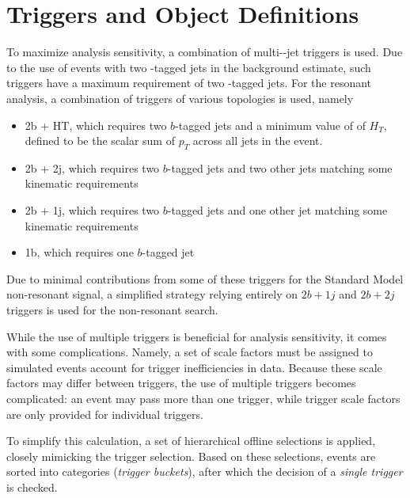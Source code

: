 \section{Triggers and Object Definitions}
\label{sec:trigger}
To maximize analysis sensitivity, a combination of multi-\Pqb-jet triggers is used. Due to the 
use of events with two \Pqb-tagged jets in the background estimate, such triggers have a maximum 
requirement of two \Pqb-tagged jets. For the resonant analysis, a combination of triggers of 
various topologies is used, namely
\begin{itemize}
	\item 2b + HT, which requires two $b$-tagged jets and a minimum value of of $H_{T}$, defined to be the scalar sum of $p_{T}$ across all jets in the event.
	\item 2b + 2j, which requires two $b$-tagged jets and two other jets matching some kinematic requirements
	\item 2b + 1j, which requires two $b$-tagged jets and one other jet matching some kinematic requirements
	\item 1b, which requires one $b$-tagged jet
\end{itemize}
Due to minimal contributions from some of these triggers for the Standard Model non-resonant signal, a simplified strategy relying entirely on $2b+1j$ and $2b+2j$ triggers is used for the non-resonant search.

While the use of multiple triggers is beneficial for analysis sensitivity, it comes with some
complications. Namely, a set of scale factors must be assigned to simulated events 
account for trigger inefficiencies in data. Because these scale factors may differ between 
triggers, the use of multiple triggers becomes complicated: an event may pass more than one trigger,
while trigger scale factors are only provided for individual triggers.

To simplify this calculation, a set of hierarchical offline selections is applied, closely 
mimicking the trigger selection. Based on these selections, events are sorted into categories
(\emph{trigger buckets}), after which the decision of a \emph{single trigger} is checked. 

